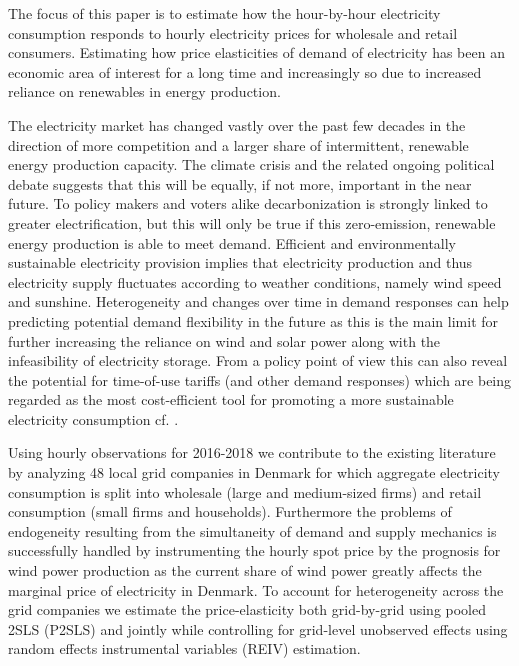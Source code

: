 \label{sec:intro}
The focus of this paper is to estimate how the hour-by-hour electricity consumption responds to hourly electricity prices for wholesale and retail consumers. Estimating how price elasticities of demand of electricity has been an economic area of interest for a long time and increasingly so due to increased reliance on renewables in energy production. \bigskip \par
The electricity market has changed vastly over the past few decades in the direction of more competition and a larger share of intermittent, renewable energy production capacity. The climate crisis and the related ongoing political debate suggests that this will be equally, if not more, important in the near future. To policy makers and voters alike decarbonization is strongly linked to greater electrification, but this will only be true if this zero-emission, renewable energy production is able to meet demand.  Efficient and environmentally sustainable electricity provision implies that electricity production and thus electricity supply fluctuates according to weather conditions, namely wind speed and sunshine. Heterogeneity and changes over time in demand responses can help predicting potential demand flexibility in the future as this is the main limit for further increasing the reliance on wind and solar power along with the infeasibility of electricity storage. From a policy point of view this can also reveal the potential for time-of-use tariffs (and other demand responses) which are being regarded as the most cost-efficient tool for promoting a more sustainable electricity consumption cf. \citet{albadi2008summary}. \bigskip \par
Using hourly observations for 2016-2018 we contribute to the existing literature by analyzing 48 local grid companies in Denmark for which aggregate electricity consumption is split into wholesale (large and medium-sized firms) and retail consumption (small firms and households). Furthermore the problems of endogeneity resulting from the simultaneity of demand and supply mechanics is successfully handled by instrumenting the hourly spot price by the prognosis for wind power production as the current share of wind power greatly affects the marginal price of electricity in Denmark. To account for heterogeneity across the grid companies we estimate the price-elasticity both grid-by-grid using pooled 2SLS (P2SLS) and jointly while controlling for grid-level unobserved effects using random effects instrumental variables (REIV) estimation.
